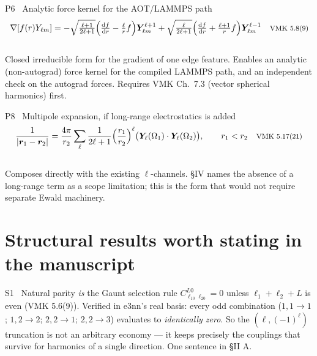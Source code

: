 \documentclass[10pt,a4paper]{article}
\newcommand{\rr}{\bm{r}}
\begin{document}
\begin{derbox}{P6 \ Analytic force kernel for the AOT/LAMMPS path}
\vspace{-6pt}
\begin{equation*}
\nabla\!\left[f(r)Y_{\ell m}\right]
= -\sqrt{\tfrac{\ell+1}{2\ell+1}}\Big(\tfrac{\mathrm df}{\mathrm dr}-\tfrac{\ell}{r}f\Big)\bm Y^{\ell+1}_{\ell m}
+ \sqrt{\tfrac{\ell}{2\ell+1}}\Big(\tfrac{\mathrm df}{\mathrm dr}+\tfrac{\ell+1}{r}f\Big)\bm Y^{\ell-1}_{\ell m}
\quad\text{\footnotesize VMK 5.8(9)}
\end{equation*}
\vspace{-8pt}\\
\footnotesize Closed irreducible form for the gradient of one edge feature. Enables an
analytic (non-autograd) force kernel for the compiled LAMMPS path, and an independent
check on the autograd forces. Requires VMK Ch.~7.3 (vector spherical harmonics) first.
\end{derbox}

\begin{derbox}{P8 \ Multipole expansion, if long-range electrostatics is added}
\vspace{-6pt}
\begin{equation*}
\frac{1}{|\rr_1-\rr_2|} = \frac{4\pi}{r_2}\sum_{\ell}\frac{1}{2\ell+1}
\Big(\frac{r_1}{r_2}\Big)^{\ell}\big(\bm Y_\ell(\Omega_1)\cdot\bm Y_\ell(\Omega_2)\big),
\qquad r_1<r_2
\quad\text{\footnotesize VMK 5.17(21)}
\end{equation*}
\vspace{-8pt}\\
\footnotesize Composes directly with the existing $\ell$-channels. \S IV names the absence
of a long-range term as a scope limitation; this is the form that would not require
separate Ewald machinery.
\end{derbox}

\section{Structural results worth stating in the manuscript}

\begin{derbox}{S1 \ Natural parity \emph{is} the Gaunt selection rule}
\footnotesize
$C^{L0}_{\ell_10\ell_20}=0$ unless $\ell_1+\ell_2+L$ is even (VMK 5.6(9)). Verified in
e3nn's real basis: every odd combination ($1,1\!\to\!1$; $1,2\!\to\!2$; $2,2\!\to\!1$;
$2,2\!\to\!3$) evaluates to \emph{identically zero}. So the $(\ell,(-1)^\ell)$ truncation is
not an arbitrary economy --- it keeps precisely the couplings that survive for harmonics of
a single direction. One sentence in \S II A.
\end{derbox}
\end{document}
